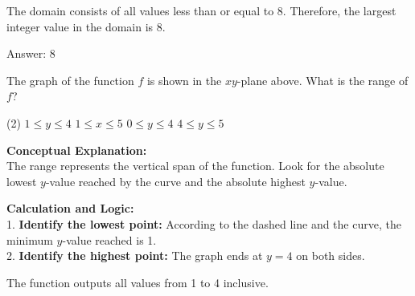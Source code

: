 \documentclass[11pt,paper=a4,answers]{exam}
\begin{document}
\begin{questions}
\begin{solution}
\vspace{15pt}

The domain consists of all values less than or equal to 8. Therefore, the largest integer value in the domain is 8.

\vspace{30pt}

Answer: \colorbox{yellow!100}{8}
\end{solution}

\vspace{40pt}

\question
\begin{center}
\end{center}
The graph of the function $f$ is shown in the $xy$-plane above. What is the range of $f$?
\begin{tasks}(2)
    \task $1 \leq y \leq 4$
    \task $1 \leq x \leq 5$
    \task $0 \leq y \leq 4$
    \task $4 \leq y \leq 5$
\end{tasks}

\begin{solution}
\textbf{Conceptual Explanation:} \\
The range represents the vertical span of the function. Look for the absolute lowest $y$-value reached by the curve and the absolute highest $y$-value.

\vspace{30pt}

\textbf{Calculation and Logic:} \\
1. \textbf{Identify the lowest point:} According to the dashed line and the curve, the minimum $y$-value reached is 1. \\
2. \textbf{Identify the highest point:} The graph ends at $y = 4$ on both sides.

\vspace{15pt}

The function outputs all values from 1 to 4 inclusive.

\vspace{30pt}


\end{solution}
\end{questions}
\end{document}
